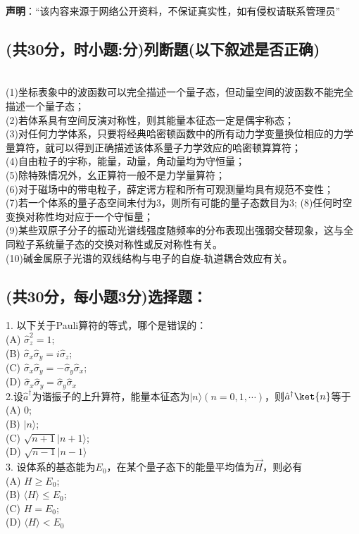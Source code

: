
\textbf{声明}：“该内容来源于网络公开资料，不保证真实性，如有侵权请联系管理员”

\subsection{(共30分，时小题:分)列断題(以下叙述是否正确)}
\\(1)坐标表象中的波函数可以完全描述一个量子态，但动量空间的波函数不能完全描述一个量子态；\\
(2)若体系具有空间反演对称性，则其能量本征态一定是偶宇称态；\\
(3)对任何力学体系，只要将经典哈密顿函数中的所有动力学变量换位相应的力学量算符，就可以得到正确描述该体系量子力学效应的哈密顿算算符；\\
(4)自由粒子的宇称，能量，动量，角动量均为守恒量；\\
(5)除特殊情况外，幺正算符一般不是力学量算符；\\
(6)对于磁场中的带电粒子，薛定谔方程和所有可观测量均具有规范不变性；\\
(7)若一个体系的量子态空间未付为3，则所有可能的量子态数目为3;
(8)任何时空变换对称性均对应于一个守恒量；\\
(9)某些双原子分子的振动光谱线强度随频率的分布表现出强弱交替现象，这与全同粒子系统量子态的交换对称性或反对称性有关。\\
(10)碱金属原子光谱的双线结构与电子的自旋-轨道耦合效应有关。\\
\subsection{(共30分，每小题3分)选择题：}

1. 以下关于Pauli算符的等式，哪个是错误的：\\
   (A) $\hat{\sigma}_z^2 = 1$; \\
   (B) $\hat{\sigma}_x \hat{\sigma}_y = i\hat{\sigma}_z$; \\
   (C) $\hat{\sigma}_x \hat{\sigma}_y = -\hat{\sigma}_y \hat{\sigma}_x$; \\
   (D) $\hat{\sigma}_x \hat{\sigma}_y = \hat{\sigma}_y \hat{\sigma}_x$\\

2.设$\hat{a}^\dagger$为谐振子的上升算符，能量本征态为$|n\rangle (n=0,1,\cdots)$，则$\hat{a}^\dagger \ket{n}$等于\\
   (A) $0$;\\ 
   (B) $|n\rangle$; \\
   (C) $\sqrt{n+1}|n+1\rangle$; \\
   (D) $\sqrt{n-1}|n-1\rangle$\\

3. 设体系的基态能为$E_0$，在某个量子态下的能量平均值为$\overrightarrow{H} $，则必有\\
   (A) $H \geq E_0$; \\
   (B) $\langle H \rangle \leq E_0$; \\
   (C) $H = E_0$; \\
   (D) $\langle H \rangle < E_0$\\